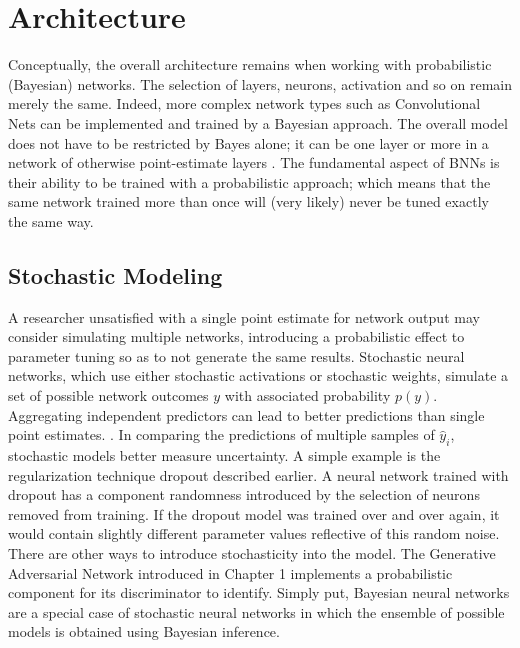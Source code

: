 \section{Architecture}

Conceptually, the overall architecture remains when working with probabilistic (Bayesian) networks.  The selection of layers, neurons, activation and so on remain merely the same.  Indeed, more complex network types such as Convolutional Nets \cite{shridhar2019comprehensive} can be implemented and trained by a Bayesian approach.  The overall model does not have to be restricted by Bayes alone; it can be one layer or more in a network of otherwise point-estimate layers \cite{Jospin}.  The fundamental aspect of BNNs is their ability to be trained with a probabilistic approach; which means that the same network trained more than once will (very likely) never be tuned exactly the same way.


\subsection{Stochastic Modeling}


A researcher unsatisfied with a single point estimate for network output may consider simulating multiple networks, introducing a probabilistic effect to parameter tuning so as to not generate the same results. Stochastic neural networks, which use either stochastic activations \cite{yu2021simple} or stochastic weights, simulate a set of possible network outcomes $y$ with associated probability $p(y)$.  Aggregating independent predictors can lead to better predictions than single point estimates. \cite{Jospin}.  In comparing the predictions of multiple samples of $\hat{y}_i$, stochastic models better measure uncertainty.  A simple example is the regularization technique dropout \cite{goan2020bayesian} described earlier.  A neural network trained with dropout has a component randomness introduced by the selection of neurons removed from training.  If the dropout model was trained over and over again, it would contain slightly different parameter values reflective of this random noise.  There are other ways to introduce stochasticity into the model.  The Generative Adversarial Network \cite{ziyin2022stochastic} introduced in Chapter 1 implements a probabilistic component for its discriminator to identify.  %
Simply put, Bayesian neural networks are a special case of stochastic neural networks in which the ensemble of possible models is obtained using Bayesian inference. \cite{mackay1992practical}


